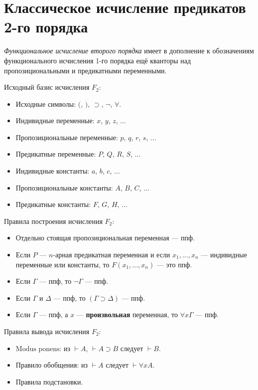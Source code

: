 \section{Классическое исчисление предикатов 2-го порядка}

\textit{Функциональное исчисление второго порядка} имеет в дополнение к обозначениям функционального исчисления 1-го порядка ещё кванторы над пропозициональными и предикатными переменными.

Исходный базис исчисления $F_2$:
\begin{itemize}
    \item Исходные символы: $($, $)$, $\supset$, $\lnot$, $\forall$.
    \item Индивидные переменные: $x$, $y$, $z$, $\dots$
    \item Пропозициональные переменные: $p$, $q$, $r$, $s$, $\dots$
    \item Предикатные переменные: $P$, $Q$, $R$, $S$, $\dots$
    \item Индивидные константы: $a$, $b$, $c$, $\dots$
    \item Пропозициональные константы: $A$, $B$, $C$, $\dots$
    \item Предикатные константы: $F$, $G$, $H$, $\dots$ 
\end{itemize}

Правила построения исчисления $F_2$:
\begin{itemize}
    \item Отдельно стоящая пропозициональная переменная --- ппф.
    \item Если $P$ --- $n$-арная предикатная переменная и если $x_1,...,x_n$ --- индивидные переменные или константы, то $F(x_1,...,x_n)$ --- это ппф.
    \item Если $\Gamma$ --- ппф, то $\lnot \Gamma$ --- ппф.
    \item Если $\Gamma$ и $\Delta$ --- ппф, то $(\Gamma \supset \Delta)$ --- ппф.
    \item Если $\Gamma$ --- ппф, а $x$ --- \textbf{произвольная} переменная, то $\forall x \Gamma$ --- ппф.
\end{itemize}

Правила вывода исчисления $F_2$:
\begin{itemize}
    \item $\text{Modus ponens}$: из $\vdash A$, $\vdash A \supset B$ следует $\vdash B$.
    \item Правило обобщения: из $\vdash A$ следует $\vdash \forall x A$.
    \item Правила подстановки.
\end{itemize}

